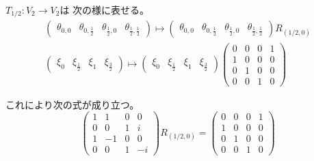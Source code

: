 \documentclass[12pt,b5paper]{ltjsarticle}
\begin{document}
\begin{description}
\begin{description}
$T_{1/2} : V_{2}\to V_{2}$は
次の様に表せる。
\begin{align}
 \begin{pmatrix}
  \theta_{0,0} & \theta_{0,\frac{1}{2}} & \theta_{\frac{1}{2},0} & \theta_{\frac{1}{2},\frac{1}{2}}
 \end{pmatrix}
\mapsto
 \begin{pmatrix}
  \theta_{0,0} & \theta_{0,\frac{1}{2}} & \theta_{\frac{1}{2},0} & \theta_{\frac{1}{2},\frac{1}{2}}
 \end{pmatrix}
R_{(1/2,0)}
 \\
 \begin{pmatrix}
  \xi_{0} & \xi_{\frac{1}{2}} & \xi_{1} & \xi_{\frac{3}{2}}
 \end{pmatrix}
\mapsto
 \begin{pmatrix}
  \xi_{0} & \xi_{\frac{1}{2}} & \xi_{1} & \xi_{\frac{3}{2}}
 \end{pmatrix}
 \begin{pmatrix}
  0 & 0 & 0 & 1 \\
  1 & 0 & 0 & 0 \\
  0 & 1 & 0 & 0 \\
  0 & 0 & 1 & 0
 \end{pmatrix}
\end{align}

これにより次の式が成り立つ。
\begin{equation}
 \begin{pmatrix}
  1 & 1 & 0 & 0 \\
  0 & 0 & 1 & i \\
  1 & -1 & 0 & 0 \\
  0 & 0 & 1 & -i
 \end{pmatrix}
 R_{(1/2,0)}
=
 \begin{pmatrix}
  0 & 0 & 0 & 1 \\
  1 & 0 & 0 & 0 \\
  0 & 1 & 0 & 0 \\
  0 & 0 & 1 & 0
 \end{pmatrix}
\end{equation}


\end{description}
\end{description}
\end{document}
